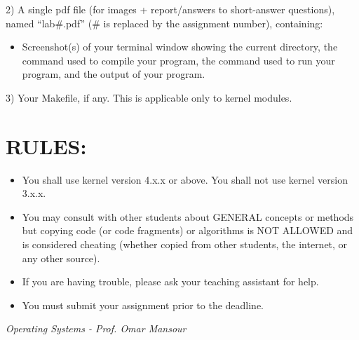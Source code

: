 \documentclass{article}
\begin{document}
2) A single pdf file (for images + report/answers to short-answer questions), named “lab\#.pdf” (\# is replaced by the assignment number), containing:
    \begin{itemize}
        \item Screenshot(s) of your terminal window showing the current directory, the command used to compile your program, the command used to run your program, and the output of your program.
    \end{itemize}

3) Your Makefile, if any. This is applicable only to kernel modules.


\section*{RULES:}

\begin{itemize}
    \item You shall use kernel version 4.x.x or above. You shall not use kernel version 3.x.x.
    \item You may consult with other students about GENERAL concepts or methods but copying code (or code fragments) or algorithms is NOT ALLOWED and is considered cheating (whether copied from other students, the internet, or any other source).
    \item If you are having trouble, please ask your teaching assistant for help.
    \item You must submit your assignment prior to the deadline.
\end{itemize}

\textit{Operating Systems - Prof. Omar Mansour}
\end{document}
